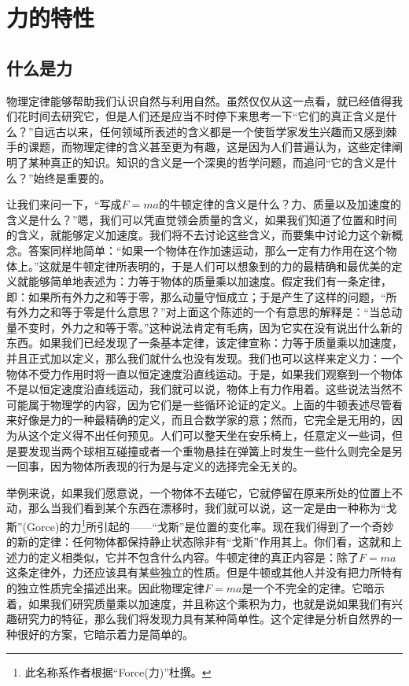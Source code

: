 \chapter{力的特性}

\section{什么是力}

物理定律能够帮助我们认识自然与利用自然。虽然仅仅从这一点看，就已经值得我们花时间去研究它，但是人们还是应当不时停下来思考一下“它们的真正含义是什么？”自远古以来，任何领域所表述的含义都是一个使哲学家发生兴趣而又感到棘手的课题，而物理定律的含义甚至更为有趣，这是因为人们普遍认为，这些定律阐明了某种真正的知识。知识的含义是一个深奥的哲学问题，而追问“它的含义是什么？”始终是重要的。

让我们来问一下，“写成$F=ma$的牛顿定律的含义是什么？力、质量以及加速度的含义是什么？”嗯，我们可以凭直觉领会质量的含义，如果我们知道了位置和时间的含义，就能够定义加速度。我们将不去讨论这些含义，而要集中讨论力这个新概念。答案同样地简单：“如果一个物体在作加速运动，那么一定有力作用在这个物体上。”这就是牛顿定律所表明的，于是人们可以想象到的力的最精确和最优美的定义就能够简单地表述为：力等于物体的质量乘以加速度。假定我们有一条定律，即：如果所有外力之和等于零，那么动量守恒成立；于是产生了这样的问题，“所有外力之和等于零是什么意思？”对上面这个陈述的一个有意思的解释是：“当总动量不变时，外力之和等于零。”这种说法肯定有毛病，因为它实在没有说出什么新的东西。如果我们已经发现了一条基本定律，该定律宣称：力等于质量乘以加速度，并且正式加以定义，那么我们就什么也没有发现。我们也可以这样来定义力：一个物体不受力作用时将一直以恒定速度沿直线运动。于是，如果我们观察到一个物体不是以恒定速度沿直线运动，我们就可以说，物体上有力作用着。这些说法当然不可能属于物理学的内容，因为它们是一些循环论证的定义。上面的牛顿表述尽管看来好像是力的一种最精确的定义，而且合数学家的意；然而，它完全是无用的，因为从这个定义得不出任何预见。人们可以整天坐在安乐椅上，任意定义一些词，但是要发现当两个球相互碰撞或者一个重物悬挂在弹簧上时发生一些什么则完全是另一回事，因为物体所表现的行为是与定义的选择完全无关的。

举例来说，如果我们愿意说，一个物体不去碰它，它就停留在原来所处的位置上不动，那么当我们看到某个东西在漂移时，我们就可以说，这一定是由一种称为“戈斯”(Gorce)的力\footnote{此名称系作者根据“Force(力)”杜撰。}所引起的——“戈斯”是位置的变化率。现在我们得到了一个奇妙的新的定律：任何物体都保持静止状态除非有“戈斯”作用其上。你们看，这就和上述力的定义相类似，它并不包含什么内容。牛顿定律的真正内容是：除了$F=ma$这条定律外，力还应该具有某些独立的性质。但是牛顿或其他人并没有把力所特有的独立性质完全描述出来。因此物理定律$F=ma$是一个不完全的定律。它暗示着，如果我们研究质量乘以加速度，并且称这个乘积为力，也就是说如果我们有兴趣研究力的特征，那么我们将发现力具有某种简单性。这个定律是分析自然界的一种很好的方案，它暗示着力是简单的。

